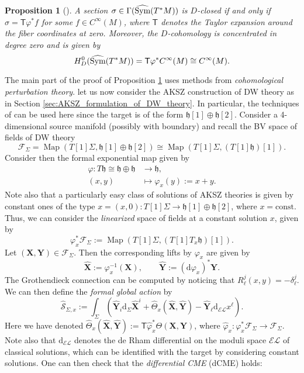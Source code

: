 \documentclass[11pt,colorinlistoftodos]{amsart}
\numberwithin{equation}{subsection}
\theoremstyle{plain}
\newtheorem{prop}[thm]{Proposition}
\theoremstyle{definition}
\theoremstyle{remark}
\newcommand{\dd}{{\mathrm{d}}}
\newcommand{\calS}{\mathcal{S}}
\newcommand{\calF}{\mathcal{F}}
\DeclareMathOperator{\Map}{Map}
\newcommand{\Sym}{\textnormal{Sym}}
\begin{document}
\begin{prop}[\cite{Moshayedi2020}]\label{prop:formal_geometry}
A section $\sigma\in \Gamma(\widehat{\Sym}(T^*M))$ is $D$-closed if and only if $\sigma=\mathsf{T}\varphi^*f$ for some $f\in C^\infty(M)$, where $\mathsf{T}$ denotes the Taylor expansion around the fiber coordinates at zero. Moreover, the $D$-cohomology is concentrated in degree zero and is given by
\[
H_D^0(\widehat{\Sym}(T^*M))=\mathsf{T}\varphi^*C^\infty(M)\cong C^\infty(M).
\]
\end{prop}

The main part of the proof of Proposition \ref{prop:formal_geometry} uses methods from \emph{cohomological perturbation theory}. let us now consider the AKSZ construction of DW theory as in Section \ref{sec:AKSZ_formulation_of_DW_theory}. In particular, the techniques of \cite{CMW4} can be used here since the target is of the form $\mathfrak{h}[1]\oplus\mathfrak{h}[2]$. Consider a 4-dimensional source manifold (possibly with boundary) and recall the BV space of fields of DW theory
\[
\calF_{\Sigma}=\Map(T[1]\Sigma,\mathfrak{h}[1]\oplus\mathfrak{h}[2])\cong\Map(T[1]\Sigma,(T[1]\mathfrak{h})[1]).
\]
Consider then the formal exponential map given by 
\begin{align*}
    \varphi\colon T\mathfrak{h}\cong\mathfrak{h}\oplus\mathfrak{h}&\to \mathfrak{h},\\
    (x,y)&\mapsto \varphi_x(y):=x+y.
\end{align*}
Note also that a particularly easy class of solutions of AKSZ theories is given by constant ones of the type $x=(x,0)\colon T[1]\Sigma\to \mathfrak{h}[1]\oplus \mathfrak{h}[2]$, where $x=\mathrm{const}$.
Thus, we can consider the \emph{linearized} space of fields at a constant solution $x$, given by
\[
\varphi_x^*\calF_\Sigma:=\Map(T[1]\Sigma,(T[1]T_x\mathfrak{h})[1]).
\]
Let $(\mathbf{X},\mathbf{Y})\in\calF_\Sigma$. Then the corresponding lifts by $\varphi_x$ are given by 
\[
\widehat{\mathbf{X}}:=\varphi_x^{-1}(\mathbf{X}),\qquad \widehat{\mathbf{Y}}:=(\dd\varphi_x)^*\mathbf{Y}.
\]
The Grothendieck connection can be computed by noticing that $R^j_\ell(x,y)=-\delta_\ell^j$.
We can then define the \emph{formal global action} by 
\[
\widehat{\calS}_{\Sigma,x}:=\int_\Sigma\left(\widehat{\mathbf{Y}}_i\dd_\Sigma\widehat{\mathbf{X}}^i+\widehat{\Theta}_x(\widehat{\mathbf{X}},\widehat{\mathbf{Y}})-\widehat{\mathbf{Y}}_\ell\dd_{\mathcal{EL}} x^\ell\right).
\]
Here we have denoted $\widehat{\Theta}_x(\widehat{\mathbf{X}},\widehat{\mathbf{Y}}):=\mathsf{T}\widehat{\varphi}_x^*\Theta(\mathbf{X},\mathbf{Y})$, where $\widehat{\varphi}_x\colon \varphi_x^*\calF_\Sigma\to \calF_\Sigma$. Note also that $\dd_{\mathcal{EL}}$ denotes the de Rham differential on the moduli space $\mathcal{EL}$ of classical solutions, which can be identified with the target by considering constant solutions. One can then check that the \emph{differential CME} (dCME) holds:
\end{document}
